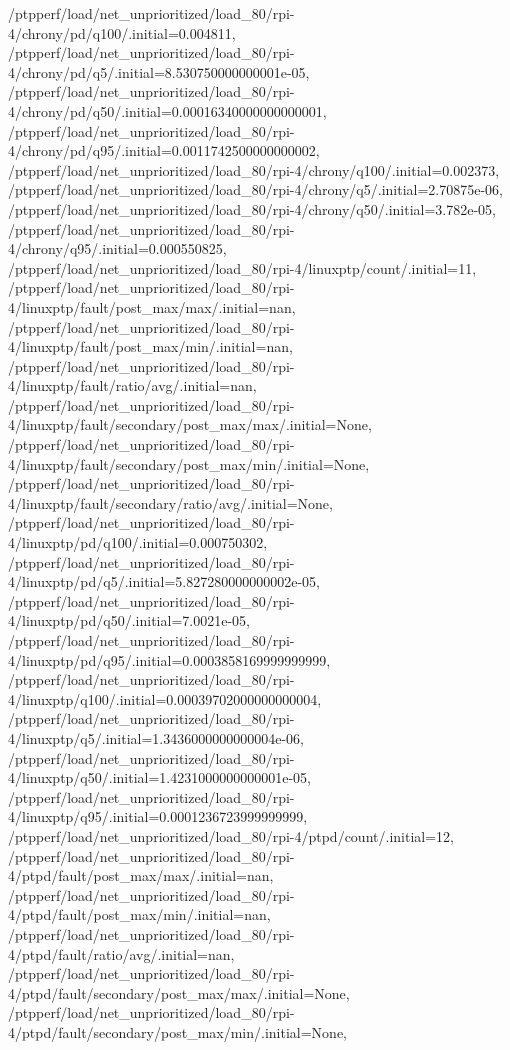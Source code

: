 {    /ptpperf/load/net_unprioritized/load_80/rpi-4/chrony/pd/q100/.initial=0.004811,
    /ptpperf/load/net_unprioritized/load_80/rpi-4/chrony/pd/q5/.initial=8.530750000000001e-05,
    /ptpperf/load/net_unprioritized/load_80/rpi-4/chrony/pd/q50/.initial=0.00016340000000000001,
    /ptpperf/load/net_unprioritized/load_80/rpi-4/chrony/pd/q95/.initial=0.0011742500000000002,
    /ptpperf/load/net_unprioritized/load_80/rpi-4/chrony/q100/.initial=0.002373,
    /ptpperf/load/net_unprioritized/load_80/rpi-4/chrony/q5/.initial=2.70875e-06,
    /ptpperf/load/net_unprioritized/load_80/rpi-4/chrony/q50/.initial=3.782e-05,
    /ptpperf/load/net_unprioritized/load_80/rpi-4/chrony/q95/.initial=0.000550825,
    /ptpperf/load/net_unprioritized/load_80/rpi-4/linuxptp/count/.initial=11,
    /ptpperf/load/net_unprioritized/load_80/rpi-4/linuxptp/fault/post_max/max/.initial=nan,
    /ptpperf/load/net_unprioritized/load_80/rpi-4/linuxptp/fault/post_max/min/.initial=nan,
    /ptpperf/load/net_unprioritized/load_80/rpi-4/linuxptp/fault/ratio/avg/.initial=nan,
    /ptpperf/load/net_unprioritized/load_80/rpi-4/linuxptp/fault/secondary/post_max/max/.initial=None,
    /ptpperf/load/net_unprioritized/load_80/rpi-4/linuxptp/fault/secondary/post_max/min/.initial=None,
    /ptpperf/load/net_unprioritized/load_80/rpi-4/linuxptp/fault/secondary/ratio/avg/.initial=None,
    /ptpperf/load/net_unprioritized/load_80/rpi-4/linuxptp/pd/q100/.initial=0.000750302,
    /ptpperf/load/net_unprioritized/load_80/rpi-4/linuxptp/pd/q5/.initial=5.827280000000002e-05,
    /ptpperf/load/net_unprioritized/load_80/rpi-4/linuxptp/pd/q50/.initial=7.0021e-05,
    /ptpperf/load/net_unprioritized/load_80/rpi-4/linuxptp/pd/q95/.initial=0.0003858169999999999,
    /ptpperf/load/net_unprioritized/load_80/rpi-4/linuxptp/q100/.initial=0.00039702000000000004,
    /ptpperf/load/net_unprioritized/load_80/rpi-4/linuxptp/q5/.initial=1.3436000000000004e-06,
    /ptpperf/load/net_unprioritized/load_80/rpi-4/linuxptp/q50/.initial=1.4231000000000001e-05,
    /ptpperf/load/net_unprioritized/load_80/rpi-4/linuxptp/q95/.initial=0.0001236723999999999,
    /ptpperf/load/net_unprioritized/load_80/rpi-4/ptpd/count/.initial=12,
    /ptpperf/load/net_unprioritized/load_80/rpi-4/ptpd/fault/post_max/max/.initial=nan,
    /ptpperf/load/net_unprioritized/load_80/rpi-4/ptpd/fault/post_max/min/.initial=nan,
    /ptpperf/load/net_unprioritized/load_80/rpi-4/ptpd/fault/ratio/avg/.initial=nan,
    /ptpperf/load/net_unprioritized/load_80/rpi-4/ptpd/fault/secondary/post_max/max/.initial=None,
    /ptpperf/load/net_unprioritized/load_80/rpi-4/ptpd/fault/secondary/post_max/min/.initial=None,
}
